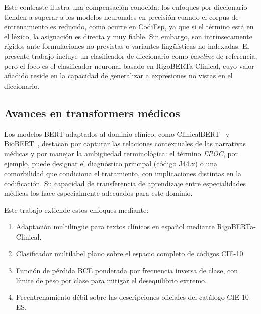 Este contraste ilustra una compensación conocida: los enfoques por diccionario tienden a superar a los modelos neuronales en precisión cuando el corpus de entrenamiento es reducido, como ocurre en CodiEsp, ya que si el término está en el léxico, la asignación es directa y muy fiable. Sin embargo, son intrínsecamente rígidos ante formulaciones no previstas o variantes lingüísticas no indexadas. El presente trabajo incluye un clasificador de diccionario como \emph{baseline} de referencia, pero el foco es el clasificador neuronal basado en RigoBERTa-Clinical, cuyo valor añadido reside en la capacidad de generalizar a expresiones no vistas en el diccionario.

\subsection{Avances en transformers médicos}
Los modelos BERT adaptados al dominio clínico, como ClinicalBERT~\cite{alsentzer2019} y BioBERT~\cite{lee2020}, destacan por capturar las relaciones contextuales de las narrativas médicas y por manejar la ambigüedad terminológica: el término \emph{EPOC}, por ejemplo, puede designar el diagnóstico principal (código J44.x) o una comorbilidad que condiciona el tratamiento, con implicaciones distintas en la codificación. Su capacidad de transferencia de aprendizaje entre especialidades médicas los hace especialmente adecuados para este dominio.

Este trabajo extiende estos enfoques mediante:
\begin{enumerate}
\item Adaptación multilingüe para textos clínicos en español mediante RigoBERTa-Clinical.
\item Clasificador multilabel plano sobre el espacio completo de códigos CIE-10.
\item Función de pérdida BCE ponderada por frecuencia inversa de clase, con límite de peso por clase para mitigar el desequilibrio extremo.
\item Preentrenamiento débil sobre las descripciones oficiales del catálogo CIE-10-ES.
\end{enumerate}

